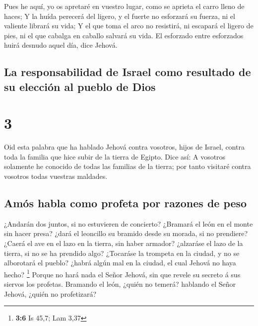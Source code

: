  Pues he aquí, yo os apretaré en vuestro lugar, como se
aprieta el carro lleno de haces;  Y la huída perecerá del
ligero, y el fuerte no esforzará su fuerza, ni el valiente librará su
vida;  Y el que toma el arco no resistirá, ni escapará el
ligero de pies, ni el que cabalga en caballo salvará su vida.
 El esforzado entre esforzados huirá desnudo aquel día,
dice Jehová.

\hypertarget{la-responsabilidad-de-israel-como-resultado-de-su-elecciuxf3n-al-pueblo-de-dios}{%
\subsection{La responsabilidad de Israel como resultado de su elección
al pueblo de
Dios}\label{la-responsabilidad-de-israel-como-resultado-de-su-elecciuxf3n-al-pueblo-de-dios}}

\hypertarget{section-2}{%
\section{3}\label{section-2}}

 Oid esta palabra que ha hablado Jehová contra vosotros,
hijos de Israel, contra toda la familia que hice subir de la tierra de
Egipto. Dice así:  A vosotros solamente he conocido de todas
las familias de la tierra; por tanto visitaré contra vosotros todas
vuestras maldades.

\hypertarget{amuxf3s-habla-como-profeta-por-razones-de-peso}{%
\subsection{Amós habla como profeta por razones de
peso}\label{amuxf3s-habla-como-profeta-por-razones-de-peso}}

 ¿Andarán dos juntos, si no estuvieren de concierto?
 ¿Bramará el león en el monte sin hacer presa? ¿dará el
leoncillo su bramido desde su morada, si no prendiere? 
¿Caerá el ave en el lazo en la tierra, sin haber armador? ¿alzaráse el
lazo de la tierra, si no se ha prendido algo?  ¿Tocaráse la
trompeta en la ciudad, y no se alborotará el pueblo? ¿habrá algún mal en
la ciudad, el cual Jehová no haya hecho? \footnote{\textbf{3:6} Is 45,7;
  Lam 3,37}  Porque no hará nada el Señor Jehová, sin que
revele su secreto á sus siervos los profetas.  Bramando el
león, ¿quién no temerá? hablando el Señor Jehová, ¿quién no profetizará?

